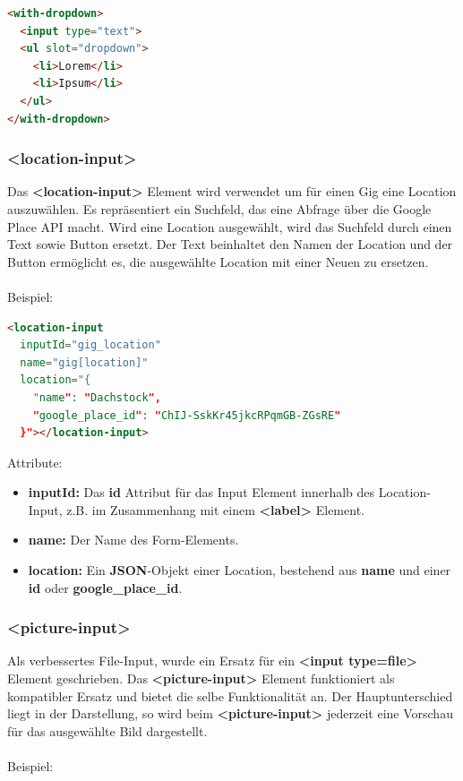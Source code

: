 \begin{lstlisting}[language=html,frame=single]
<with-dropdown>
  <input type="text">
  <ul slot="dropdown">
    <li>Lorem</li>
    <li>Ipsum</li>
  </ul>
</with-dropdown>
\end{lstlisting}

\subsubsection{<location-input>}

Das \textbf{<location-input>} Element wird verwendet um für einen Gig eine
Location auszuwählen. Es repräsentiert ein Suchfeld, das eine Abfrage über die
Google Place API macht. Wird eine Location ausgewählt, wird das Suchfeld durch
einen Text sowie Button ersetzt. Der Text beinhaltet den Namen der Location und
der Button ermöglicht es, die ausgewählte Location mit einer Neuen zu ersetzen.\\
\\
\noindent{}Beispiel:

\begin{lstlisting}[language=html,frame=single]
<location-input
  inputId="gig_location"
  name="gig[location]"
  location="{
    "name": "Dachstock",
    "google_place_id": "ChIJ-SskKr45jkcRPqmGB-ZGsRE"
  }"></location-input>
\end{lstlisting}

\noindent{}Attribute:
\begin{itemize}
  \tightlist{}
  \item{} \textbf{inputId:} Das \textbf{id} Attribut für das Input Element innerhalb des Location-Input, z.B. im Zusammenhang mit einem \textbf{<label>} Element.
  \item{} \textbf{name:} Der Name des Form-Elements.
  \item{} \textbf{location:} Ein \textbf{JSON}-Objekt einer Location, bestehend aus \textbf{name} und einer \textbf{id} oder \textbf{google\_place\_id}.
\end{itemize}

\subsubsection{<picture-input>}

Als verbessertes File-Input, wurde ein Ersatz für ein
\textbf{<input type=file>} Element geschrieben. Das \textbf{<picture-input>}
Element funktioniert als kompatibler Ersatz und bietet die selbe Funktionalität an.
Der Hauptunterschied liegt in der Darstellung, so wird beim \textbf{<picture-input>}
jederzeit eine Vorschau für das ausgewählte Bild dargestellt.\\
\\
\noindent{}Beispiel:

